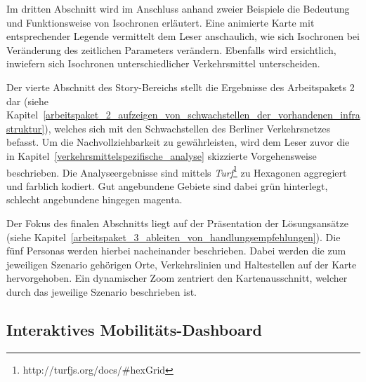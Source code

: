 Im dritten Abschnitt wird im Anschluss anhand zweier Beispiele die Bedeutung und Funktionsweise von Isochronen erläutert. Eine animierte Karte mit entsprechender Legende vermittelt dem Leser anschaulich, wie sich Isochronen bei Veränderung des zeitlichen Parameters verändern. Ebenfalls wird ersichtlich, inwiefern sich Isochronen unterschiedlicher Verkehrsmittel unterscheiden.

Der vierte Abschnitt des Story-Bereichs stellt die Ergebnisse des Arbeitspakets 2 dar (siehe Kapitel~\ref{arbeitspaket_2_aufzeigen_von_schwachstellen_der_vorhandenen_infrastruktur}), welches sich mit den Schwachstellen des Berliner Verkehrsnetzes befasst. Um die Nachvollziehbarkeit zu gewährleisten, wird dem Leser zuvor die in Kapitel~\ref{verkehrsmittelspezifische_analyse} skizzierte Vorgehensweise beschrieben. Die Analyseergebnisse sind mittels \emph{Turf}\footnote{http://turfjs.org/docs/\#hexGrid} zu Hexagonen aggregiert und farblich kodiert. Gut angebundene Gebiete sind dabei grün hinterlegt, schlecht angebundene hingegen magenta.

Der Fokus des finalen Abschnitts liegt auf der Präsentation der Lösungsansätze (siehe Kapitel~\ref{arbeitspaket_3_ableiten_von_handlungsempfehlungen}). Die fünf Personas werden hierbei nacheinander beschrieben. Dabei werden die zum jeweiligen Szenario gehörigen Orte, Verkehrslinien und Haltestellen auf der Karte hervorgehoben. Ein dynamischer Zoom zentriert den Kartenausschnitt, welcher durch das jeweilige Szenario beschrieben ist.

\subsection{Interaktives Mobilitäts-Dashboard}
\label{interaktives_mobilitaets_dashboard}
